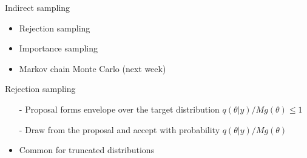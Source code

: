\documentclass[english,t]{beamer}
\begin{document}
\begin{frame}{Indirect sampling}
  
  \begin{itemize}
  \item Rejection sampling
  \item Importance sampling
  \item Markov chain Monte Carlo (next week)
  \end{itemize}

\end{frame}

\begin{frame}{Rejection sampling}

    \vspace{-.3\baselineskip}
  \begin{itemize}
  \item[-] Proposal forms envelope over the target distribution ${q(\theta|y)}/{M g(\theta)} \leq 1$
  \item[-] Draw from the proposal and accept with probability ${q(\theta|y)}/{M g(\theta)}$
  \item<3>[-] Common for truncated distributions
  \end{itemize}
  \begin{center}
    \vspace{-1.6\baselineskip}
  \end{center}

\end{frame}
\end{document}
